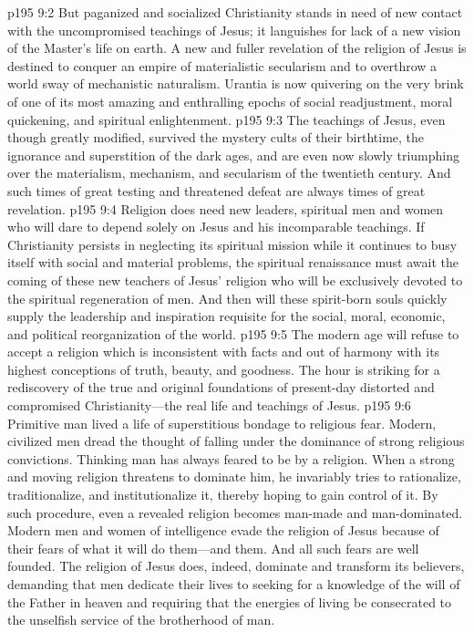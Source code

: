 \vs p195 9:2 But paganized and socialized Christianity stands in need of new contact with the uncompromised teachings of Jesus; it languishes for lack of a new vision of the Master’s life on earth. A new and fuller revelation of the religion of Jesus is destined to conquer an empire of materialistic secularism and to overthrow a world sway of mechanistic naturalism. Urantia is now quivering on the very brink of one of its most amazing and enthralling epochs of social readjustment, moral quickening, and spiritual enlightenment.
\vs p195 9:3 The teachings of Jesus, even though greatly modified, survived the mystery cults of their birthtime, the ignorance and superstition of the dark ages, and are even now slowly triumphing over the materialism, mechanism, and secularism of the twentieth century. And such times of great testing and threatened defeat are always times of great revelation.
\pc \vs p195 9:4 Religion does need new leaders, spiritual men and women who will dare to depend solely on Jesus and his incomparable teachings. If Christianity persists in neglecting its spiritual mission while it continues to busy itself with social and material problems, the spiritual renaissance must await the coming of these new teachers of Jesus’ religion who will be exclusively devoted to the spiritual regeneration of men. And then will these spirit\hyp{}born souls quickly supply the leadership and inspiration requisite for the social, moral, economic, and political reorganization of the world.
\vs p195 9:5 The modern age will refuse to accept a religion which is inconsistent with facts and out of harmony with its highest conceptions of truth, beauty, and goodness. The hour is striking for a rediscovery of the true and original foundations of present\hyp{}day distorted and compromised Christianity---the real life and teachings of Jesus.
\pc \vs p195 9:6 Primitive man lived a life of superstitious bondage to religious fear. Modern, civilized men dread the thought of falling under the dominance of strong religious convictions. Thinking man has always feared to be  by a religion. When a strong and moving religion threatens to dominate him, he invariably tries to rationalize, traditionalize, and institutionalize it, thereby hoping to gain control of it. By such procedure, even a revealed religion becomes man\hyp{}made and man\hyp{}dominated. Modern men and women of intelligence evade the religion of Jesus because of their fears of what it will do  them---and  them. And all such fears are well founded. The religion of Jesus does, indeed, dominate and transform its believers, demanding that men dedicate their lives to seeking for a knowledge of the will of the Father in heaven and requiring that the energies of living be consecrated to the unselfish service of the brotherhood of man.\plusone
